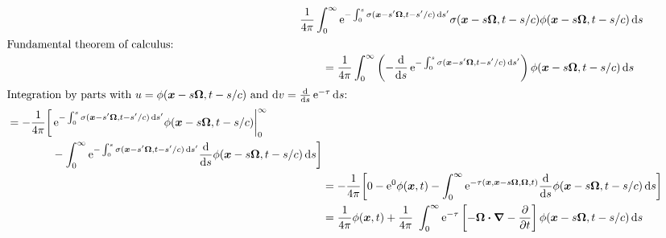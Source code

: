 \documentclass{beamer}
\newcommand{\epsiloncolor}[1]{\textcolor{blue}{#1}}
\begin{document}
\begin{frame}%
\begin{align*}
\lefteqn{\frac{1}{4\pi}\int_{0}^{\infty} \eexp^{ -\int_{0}^{s}
  \sigma(\vec{x}-s'\vec{\Omega}, t-s'/c) \ud s'} \sigma(\vec{x} - s \vec{\Omega}, t-s/c)
\phi(\vec{x} - s \vec{\Omega}, t-s/c) \ud s}\qquad&
\\ 
\intertext{Fundamental theorem of calculus:}
&=\frac{1}{4\pi}\int_{0}^{\infty} \left( - \oder{}{s} \eexp^{ -\int_{0}^{s}
  \sigma(\vec{x}-s'\vec{\Omega}, t-s'/c) \ud s'}\right)
\phi(\vec{x} - s \vec{\Omega}, t-s/c) \ud s
\\
\intertext{Integration by parts with $u=\phi(\vec{x} - s \vec{\Omega}, t-s/c)$
and $\ud v = \oder{}{s} \eexp^{-\tau} \ud s$:}
    \begin{split}
  &=-\frac{1}{4\pi} \bigg[ 
\eexp^{- \int_{0}^{s} \sigma(\vec{x}-s'\vec{\Omega}, t-s'/c) \ud s'} 
\phi(\vec{x} - s \vec{\Omega}, t-s/c) \bigg|_{0}^{\infty}
\\
&\qquad\qquad- \int_{0}^{\infty} \eexp^{- \int_{0}^{s} \sigma(\vec{x}-s'\vec{\Omega}, t-s'/c) \ud s'}
\oder{}{s} \phi(\vec{x} - s \vec{\Omega}, t-s/c)
\ud s
  \bigg]
    \end{split}
  \\
  &=-\frac{1}{4\pi} \bigg[ 
0 -  
\eexp^0 \phi(\vec{x}, t)
- \int_{0}^{\infty} \eexp^{-\tau(\vec{x}, \vec{x} - s \vec{\Omega}, \vec{\Omega}, t)}
\oder{}{s} \phi(\vec{x} - s \vec{\Omega}, t-s/c)
\ud s
  \bigg]
 \\
 &=\frac{1}{4\pi}\phi(\vec{x}, t)
+ \frac{1}{4\pi}\ \int_{0}^{\infty} \eexp^{-\tau}
\left[ -\vec{\Omega} \vd \del - \pder{}{t} \right] \phi(\vec{x} - s \vec{\Omega}, t-s/c)
\ud s
\end{align*}
\end{frame}
\end{document}
